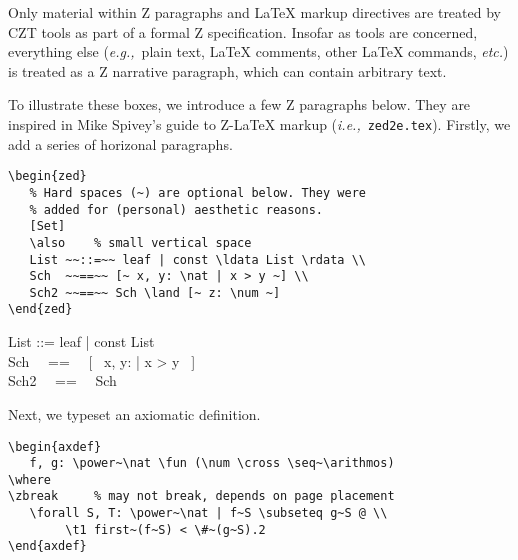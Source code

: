 \documentclass{article}
\def\gives{\endquote\endgroup\egroup}
\begin{document}
Only material within Z paragraphs and \LaTeX{} markup directives are treated by CZT tools
as part of a formal Z specification. Insofar as tools are concerned, everything else
(\textit{e.g.,}~plain text, \LaTeX{} comments, other \LaTeX{} commands, \textit{etc.})
is treated as a Z narrative paragraph, which can contain arbitrary text.

To illustrate these boxes, we introduce a few Z paragraphs below. They are inspired in
Mike Spivey's guide to Z-\LaTeX{} markup (\textit{i.e.,}~\texttt{zed2e.tex}). Firstly,
we add a series of horizonal paragraphs.
%
\begin{demo}
\begin{verbatim}
\begin{zed}
   % Hard spaces (~) are optional below. They were
   % added for (personal) aesthetic reasons.
   [Set]
   \also    % small vertical space
   List ~~::=~~ leaf | const \ldata List \rdata \\
   Sch  ~~==~~ [~ x, y: \nat | x > y ~] \\
   Sch2 ~~==~~ Sch \land [~ z: \num ~]
\end{zed}
\end{verbatim}
\gives
\begin{zed}
   [Set]
   \also    %
   List ::= leaf | const \ldata List \rdata \\
   Sch  ~~==~~ [~ x, y: \nat | x > y ~] \\
   Sch2 ~~==~~ Sch \land [~ z: \num ~]
\end{zed}
\end{demo}
%
Next, we typeset an axiomatic definition.
%
\begin{demo}
\begin{verbatim}
\begin{axdef}
   f, g: \power~\nat \fun (\num \cross \seq~\arithmos)
\where
\zbreak     % may not break, depends on page placement
   \forall S, T: \power~\nat | f~S \subseteq g~S @ \\
        \t1 first~(f~S) < \#~(g~S).2
\end{axdef}
\end{verbatim}
\gives
{}
\end{demo}
\end{document}
